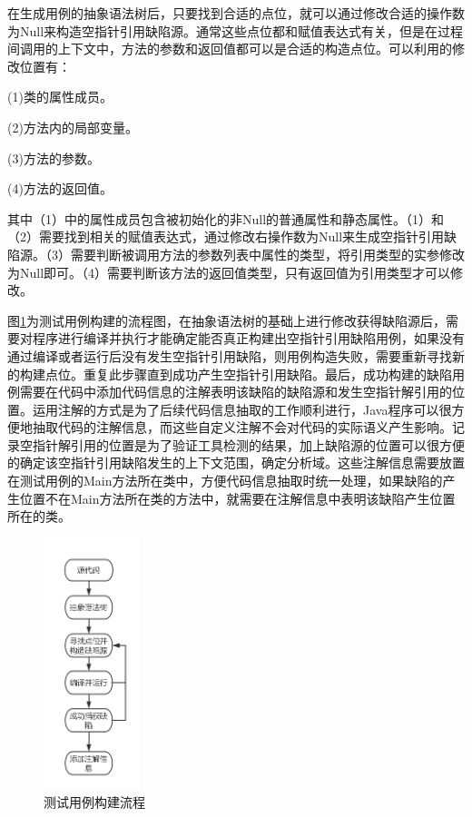在生成用例的抽象语法树后，只要找到合适的点位，就可以通过修改合适的操作数为Null来构造空指针引用缺陷源。通常这些点位都和赋值表达式有关，但是在过程间调用的上下文中，方法的参数和返回值都可以是合适的构造点位。可以利用的修改位置有：

(1)类的属性成员。

(2)方法内的局部变量。

(3)方法的参数。

(4)方法的返回值。

其中（1）中的属性成员包含被初始化的非Null的普通属性和静态属性。（1）和（2）需要找到相关的赋值表达式，通过修改右操作数为Null来生成空指针引用缺陷源。（3）需要判断被调用方法的参数列表中属性的类型，将引用类型的实参修改为Null即可。（4）需要判断该方法的返回值类型，只有返回值为引用类型才可以修改。

图\ref{fig:figure4-3}为测试用例构建的流程图，在抽象语法树的基础上进行修改获得缺陷源后，需要对程序进行编译并执行才能确定能否真正构建出空指针引用缺陷用例，如果没有通过编译或者运行后没有发生空指针引用缺陷，则用例构造失败，需要重新寻找新的构建点位。重复此步骤直到成功产生空指针引用缺陷。最后，成功构建的缺陷用例需要在代码中添加代码信息的注解表明该缺陷的缺陷源和发生空指针解引用的位置。运用注解的方式是为了后续代码信息抽取的工作顺利进行，Java程序可以很方便地抽取代码的注解信息，而这些自定义注解不会对代码的实际语义产生影响。记录空指针解引用的位置是为了验证工具检测的结果，加上缺陷源的位置可以很方便的确定该空指针引用缺陷发生的上下文范围，确定分析域。这些注解信息需要放置在测试用例的Main方法所在类中，方便代码信息抽取时统一处理，如果缺陷的产生位置不在Main方法所在类的方法中，就需要在注解信息中表明该缺陷产生位置所在的类。

\begin{figure}
	\centering
	\includegraphics[width=0.25\textwidth]{figures/parse4-3}
	\caption{测试用例构建流程}\label{fig:figure4-3}
\end{figure}

